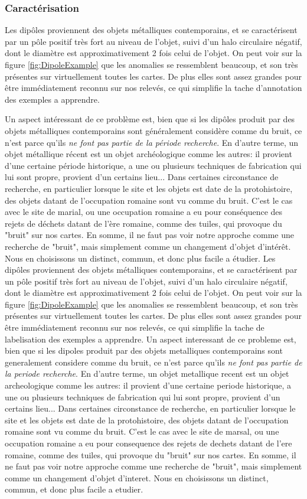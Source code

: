\documentclass[a4paper, 12pt, titlepage, oneside, french]{article}
\begin{document}
	\subsubsection{Caractérisation}
	Les dipôles proviennent des objets métalliques contemporains, et se caractérisent par un pôle positif très fort au niveau de l'objet, suivi d'un halo circulaire négatif, dont le diamètre est approximativement 2 fois celui de l'objet. On peut voir sur la figure \ref{fig:DipoleExample} que les anomalies se ressemblent beaucoup, et son très présentes sur virtuellement toutes les cartes. De plus elles sont assez grandes pour être immédiatement reconnu sur nos relevés, ce qui simplifie la tache d'annotation des exemples a apprendre. 

Un aspect intéressant de ce problème est, bien que si les dipôles produit par des objets métalliques contemporains sont généralement considère comme du bruit, ce n'est parce qu'ils \textit{ne font pas partie de la période recherche}. En d'autre terme, un objet métallique récent est un objet archéologique comme les autres: il provient d'une certaine période historique, a une ou plusieurs techniques de fabrication qui lui sont propre, provient d'un certains lieu... Dans certaines circonstance de recherche, en particulier lorsque le site et les objets est date de la protohistoire, des objets datant de l'occupation romaine sont vu comme du bruit. C'est le cas avec le site de marial, ou une occupation romaine a eu pour conséquence des rejets de déchets datant de l'ère romaine, comme des tuiles, qui provoque du "bruit" sur nos cartes. En somme, il ne faut pas voir notre approche comme une recherche de "bruit", mais simplement comme un changement d'objet d'intérêt. Nous en choisissons un distinct, commun, et donc plus facile a étudier.
	Les dipôles proviennent des objets métalliques contemporains, et se caractérisent par un pôle positif très fort au niveau de l'objet, suivi d'un halo circulaire négatif, dont le diamètre est approximativement 2 fois celui de l'objet. On peut voir sur la figure \ref{fig:DipoleExample} que les anomalies se ressemblent beaucoup, et son très présentes sur virtuellement toutes les cartes. De plus elles sont assez grandes pour être immédiatement reconnu sur nos relevés, ce qui simplifie la tache de labelisation des exemples a apprendre. 
	Un aspect interessant de ce probleme est, bien que si les dipoles produit par des objets metalliques contemporains sont generalement considere comme du bruit, ce n'est parce qu'ils \textit{ne font pas partie de la periode recherche}. En d'autre terme, un objet metallique recent est un objet archeologique comme les autres: il provient d'une certaine periode historique, a une ou plusieurs techniques de fabrication qui lui sont propre, provient d'un certains lieu... Dans certaines circonstance de recherche, en particulier lorsque le site et les objets est date de la protohistoire, des objets datant de l'occupation romaine sont vu comme du bruit. C'est le cas avec le site de marsal, ou une occupation romaine a eu pour consequence des rejets de dechets datant de l'ere romaine, comme des tuiles, qui provoque du "bruit" sur nos cartes. En somme, il ne faut pas voir notre approche comme une recherche de "bruit", mais simplement comme un changement d'objet d'interet. Nous en choisissons un distinct, commun, et donc plus facile a etudier.
\end{document}
